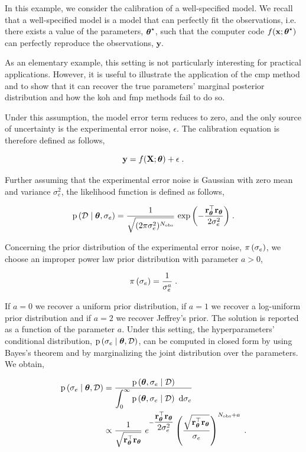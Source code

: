 In this example, we consider the calibration of a well-specified model. We recall that a well-specified model is a model that can perfectly fit the observations, i.e. there exists a value of the parameters, $\boldsymbol{\theta}^\star$, such that the computer code $f(\mathbf{x}; \boldsymbol{\theta}^\star)$ can perfectly reproduce the observations, $\mathbf{y}$. 

\smallskip
As an elementary example, this setting is not particularly interesting for practical applications. However, it is useful to illustrate the application of the \gls{cmp} method and to show that it can recover the true parameters' marginal posterior distribution and how the \gls{koh} and \gls{fmp} methods fail to do so.

\smallskip
Under this assumption, the model error term reduces to zero, and the only source of uncertainty is the experimental error noise, $\epsilon$. The calibration equation is therefore defined as follows,

\begin{equation}
    \mathbf{y} = f(\mathbf{X}; \boldsymbol{\theta}) + \epsilon \;.
\end{equation}

Further assuming that the experimental error noise is Gaussian with zero mean and variance $\sigma_e^2$, the likelihood function is defined as follows,

\begin{equation}
    \mathrm{p} \left(  \mathcal{D} \mid \boldsymbol{\theta}, \sigma_e \right) = \dfrac{1}{\displaystyle\sqrt{(2\pi \sigma_e^2)^{N_{\mathrm{obs}}}}} \, \exp{\left(-\dfrac{\mathbf{r}_{\boldsymbol{\theta}}^{\top} \mathbf{r}_{\boldsymbol{\theta}}}{2\sigma_e ^2}\right)} \;. 
\end{equation}


Concerning the prior distribution of the experimental error noise, $\pi \left( \sigma_e\right)$, we choose an improper power law prior distribution with parameter $a>0$,

\begin{equation}
    \pi \left( \sigma_e\right) = \dfrac{1}{\sigma_e^a} \; .
\end{equation}

If $a=0$ we recover a uniform prior distribution, if $a=1$ we recover a log-uniform prior distribution and if $a=2$ we recover Jeffrey's prior. The solution is reported as a function of the parameter $a$. Under this setting, the hyperparameters' conditional distribution, $\mathrm{p} \left( \sigma_e \mid \boldsymbol{\theta}, \mathcal{D} \right)$, can be computed in closed form by using Bayes's theorem and by marginalizing the joint distribution over the parameters. We obtain,

\begin{equation}
    \left.
        \begin{aligned}
            \mathrm{p} \left( \sigma_e \mid \boldsymbol{\theta}, \mathcal{D} \right) &= \dfrac{\mathrm{p} \left( \boldsymbol{\theta}, \sigma_e \mid \mathcal{D} \right)}{\displaystyle \int_{0}^{\infty} \mathrm{p} \left( \boldsymbol{\theta}, \sigma_e \mid \mathcal{D} \right) \ \text{d} \sigma_e} \\
            &\propto\dfrac{1}{\sqrt{\mathbf{r}_{\boldsymbol{\theta}}^{\top} \mathbf{r}_{\boldsymbol{\theta}}}} \
            e^{-\dfrac{ \mathbf{r}_{\boldsymbol{\theta}}^{\top} \mathbf{r}_{\boldsymbol{\theta}} }{2 \sigma_e
            ^2}}
            \left(\dfrac{\sqrt{\mathbf{r}_{\boldsymbol{\theta}}^{\top} \mathbf{r}_{\boldsymbol{\theta}}}}{\sigma_e
            }\right)^{N_{\mathrm{obs}}+a}\; .
        \end{aligned}
    \right.
    \label{eq:cmp:cmp_noerr}
\end{equation}

